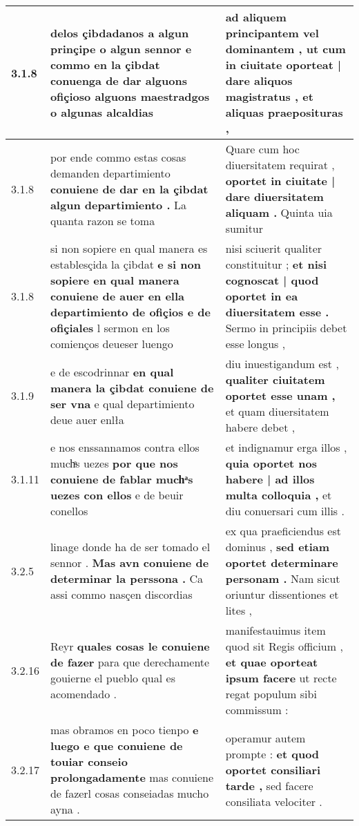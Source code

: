 \begin{tabular}{|p{1cm}|p{6.5cm}|p{6.5cm}|}
3.1.8 & delos çibdadanos a algun prinçipe o algun sennor \textbf{ e commo en la çibdat conuenga de dar alguons ofiçioso } alguons maestradgos o algunas alcaldias & ad aliquem principantem vel dominantem , \textbf{ ut cum in ciuitate oporteat | dare aliquos magistratus , } et aliquas praeposituras , \\\hline
3.1.8 & por ende commo estas cosas demanden departimiento \textbf{ conuiene de dar en la çibdat algun departimiento . } La quanta razon se toma & Quare cum hoc diuersitatem requirat , \textbf{ oportet in ciuitate | dare diuersitatem aliquam . } Quinta uia sumitur \\\hline
3.1.8 & si non sopiere en qual manera es establesçida la çibdat \textbf{ e si non sopiere en qual manera conuiene de auer en ella departimiento de ofiçios e de ofiçiales } l sermon en los comienços deueser luengo & nisi sciuerit qualiter constituitur ; \textbf{ et nisi cognoscat | quod oportet in ea diuersitatem esse . } Sermo in principiis debet esse longus , \\\hline
3.1.9 & e de escodrinnar \textbf{ en qual manera la çibdat conuiene de ser vna } e qual departimiento deue auer enlła & diu inuestigandum est , \textbf{ qualiter ciuitatem oportet esse unam , } et quam diuersitatem habere debet , \\\hline
3.1.11 & e nos enssannamos contra ellos muchͣs uezes \textbf{ por que nos conuiene de fablar muchͣs uezes con ellos } e de beuir conellos & et indignamur erga illos , \textbf{ quia oportet nos habere | ad illos multa colloquia , } et diu conuersari cum illis . \\\hline
3.2.5 & linage donde ha de ser tomado el sennor . \textbf{ Mas avn conuiene de determinar la perssona . } Ca assi commo nasçen discordias & ex qua praeficiendus est dominus , \textbf{ sed etiam oportet determinare personam . } Nam sicut oriuntur dissentiones et lites , \\\hline
3.2.16 & Reyr \textbf{ quales cosas le conuiene de fazer } para que derechamente gouierne el pueblo qual es acomendado . & manifestauimus item quod sit Regis officium , \textbf{ et quae oporteat ipsum facere } ut recte regat populum sibi commissum : \\\hline
3.2.17 & mas obramos en poco tienpo \textbf{ e luego e que conuiene de touiar conseio prolongadamente } mas conuiene de fazerl cosas conseiadas mucho ayna . & operamur autem prompte : \textbf{ et quod oportet consiliari tarde , } sed facere consiliata velociter . \\\hline

\end{tabular}
